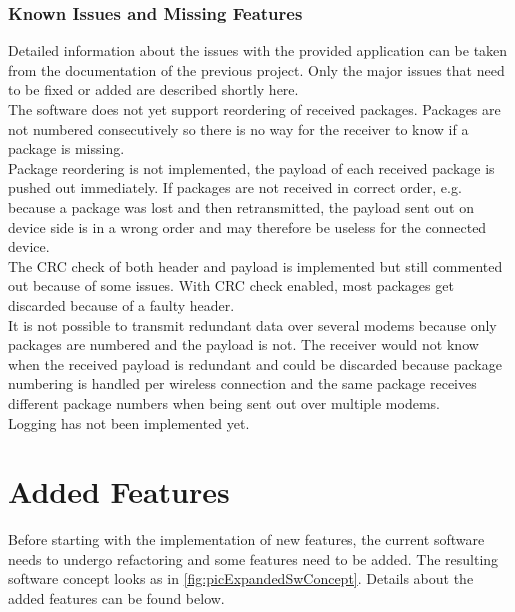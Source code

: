 \subsubsection{Known Issues and Missing Features}
Detailed information about the issues with the provided application can be taken from the documentation of the previous project. Only the major issues that need to be fixed or added are described shortly here.\\
The software does not yet support reordering of received packages. Packages are not numbered consecutively so there is no way for the receiver to know if a package is missing.\\
Package reordering is not implemented, the payload of each received package is pushed out immediately. If packages are not received in correct order, e.g. because a package was lost and then retransmitted, the payload sent out on device side is in a wrong order and may therefore be useless for the connected device.\\
The CRC check of both header and payload is implemented but still commented out because of some issues. With CRC check enabled, most packages get discarded because of a faulty header.\\
It is not possible to transmit redundant data over several modems because only packages are numbered and the payload is not. The receiver would not know when the received payload is redundant and could be discarded because package numbering is handled per wireless connection and the same package receives different package numbers when being sent out over multiple modems.\\
Logging has not been implemented yet.
%
\section{Added Features} \label{sec:txtAddedFeatures}
Before starting with the implementation of new features, the current software needs to undergo refactoring and some features need to be added. The resulting software concept looks as in \autoref{fig:picExpandedSwConcept}. Details about the added features can be found below.
%
